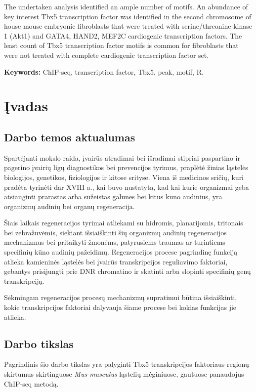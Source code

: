 \documentclass[12pt]{article}
\begin{document}
The undertaken analysis identified an ample number of motifs. An abundance
of key interest Tbx5 transcription factor was identified in the second
chromosome of house mouse embryonic fibroblasts that were treated with
serine/threonine kinase 1 (Akt1) and GATA4, HAND2, MEF2C cardiogenic
transcription factors. The least count of Tbx5 transcription factor motifs
is common for fibroblasts that were not treated with complete cardiogenic
transcription factor set. 

\hfill \break
\textbf{Keywords:} ChIP-seq, transcription factor, Tbx5, peak, motif, R.
\newpage

\section{Įvadas}
\subsection*{Darbo temos aktualumas}

Spartėjanti mokslo raida, įvairūs atradimai bei išradimai stipriai paspartino
ir pagerino įvairių ligų diagnostikos bei prevencijos tyrimus, praplėtė žinias
ląstelės biologijos, genetikos, fiziologijos ir kitose srityse. Viena iš
medicinos sričių, kuri pradėta tyrinėti dar XVIII a., kai buvo nustatyta, kad
kai kurie organizmai geba atsiauginti prarastas arba sužeistas galūnes bei
kitus kūno audinius\cite{REGENERATION}, yra organizmų audinių bei organų
regeneracija.

Šiais laikais regeneracijos tyrimai atliekami su hidromis, planarijomis,
tritonais bei zebražuvėmis\cite{ORGANISMS}, siekiant išsiaiškinti šių organizmų
audinių regeneracijos mechanizmus bei pritaikyti žmonėms, patyrusiems traumas
ar turintiems specifinių kūno audinių pažeidimų. Regeneracijos procese
pagrindinę funkciją atlieka kamieninės ląstelės bei įvairūs transkripcijos
reguliavimo faktoriai, gebantys prisijungti prie DNR chromatino ir skatinti
arba slopinti specifinių genų transkripciją.

Sėkmingam regeneracijos procesų mechanizmų supratimui būtina išsiaiškinti, 
kokie transkripcijos faktoriai dalyvauja šiame procese bei kokias funkcijas jie
atlieka.

\subsection*{Darbo tikslas}

Pagrindinis šio darbo tikslas yra palyginti Tbx5 transkripcijos faktoriaus
regionų skirtumus skirtinguose \emph{Mus musculus} ląstelių mėginiuose,
gautuose panaudojus ChIP-seq metodą.
\end{document}
